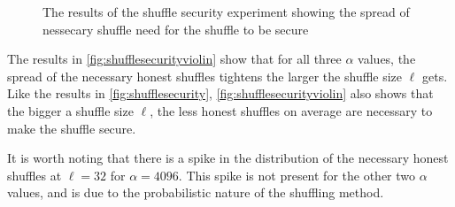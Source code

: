 \begin{figure}[!htb]
    \centering
    \qquad
    \caption{The results of the shuffle security experiment showing the spread of nessecary shuffle need for the shuffle to be secure}%
    \label{fig:shufflesecurityviolin}%
\end{figure}

The results in \autoref{fig:shufflesecurityviolin} show that for all three $\alpha$ values, the spread of the necessary honest shuffles tightens the larger the shuffle size $\ell$ gets.
Like the results in \autoref{fig:shufflesecurity}, \autoref{fig:shufflesecurityviolin} also shows that the bigger a shuffle size $\ell$, the less honest shuffles on average are necessary to make the shuffle secure.

It is worth noting that there is a spike in the distribution of the necessary honest shuffles at $\ell=32$ for $\alpha=4096$.
This spike is not present for the other two $\alpha$ values, and is due to the probabilistic nature of the shuffling method.


